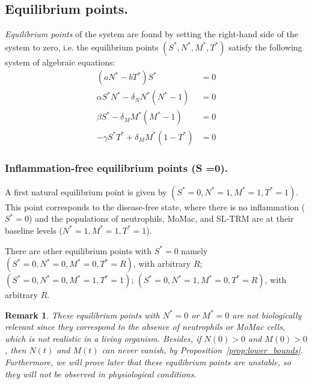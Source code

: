 \documentclass[a4paper, 12pt]{article}
\newtheorem{rem}{Remark}[section]
\begin{document}
\subsection{Equilibrium points.}
\emph{Equilibrium points} of the system are found by setting the right-hand side of the system to zero, i.e.
 the equilibrium points $(S^*, N^*, M^*, T^*)$ satisfy the following system of algebraic equations:
\begin{align}
(a N^* - b T^*) S^* &= 0 \label{eq:equilibrium_S} \\
\alpha S^* N^* - \delta_N N^* (N^* - 1) &= 0 \label{eq:equilibrium_N} \\
\beta S^* - \delta_M M^* (M^* - 1) &= 0 \label{eq:equilibrium_M} \\
-\gamma S^* T^* + \delta_M M^* (1 - T^*) &= 0 \label{eq:equilibrium_T}
\end{align}
\subsubsection{Inflammation-free equilibrium points (S =0).}\label{sec:disease_free}
A first natural equilibrium point is given by $(S^* = 0, N^* = 1, M^* = 1, T^* = 1)$. This point corresponds to the disease-free state, where there is no inflammation ($S^* = 0$) and the populations of neutrophils, MoMac, and SL-TRM are at their baseline    levels ($N^* = 1, M^* = 1, T^* = 1$).

There are other equilibrium points with $S^* = 0$  namely
$(S^* = 0, N^* = 0, M^* = 0, T^* = R)$, with arbitrary $R$;
 $(S^* = 0, N^* = 0, M^* = 1, T^* = 1)$;
 $(S^* = 0, N^* = 1, M^* = 0, T^* = R)$, with arbitrary $R$.
\begin{rem}\label{rem:vanishing}
These equilibrium points with  $N^* = 0$ or $M^* = 0$ are not biologically relevant since they correspond to the absence of neutrophils or MoMac cells, which is not realistic in a living organism.
Besides, if $N(0) > 0$ and $M(0) > 0$, then $N(t)$ and $M(t)$ can never vanish, by Proposition~\ref{prop:lower_bounds}.
Furthermore, we will prove later that these equilibrium points are unstable, so they will not be observed in physiological conditions.
\end{rem}
\end{document}
